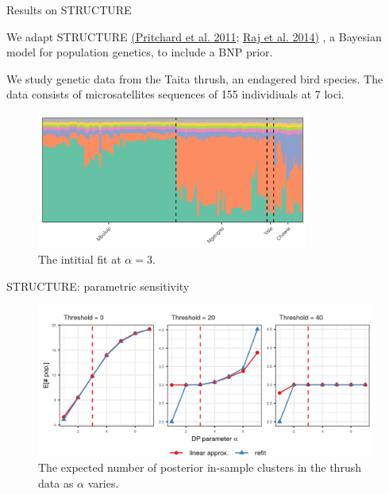 \begin{frame}{Results on STRUCTURE}

We adapt STRUCTURE
{\color{blue} \href{https://web.stanford.edu/group/pritchardlab/publications/pdfs/PritchardEtAl00.pdf}{(Pritchard et al. 2011};
\href{https://www.genetics.org/content/197/2/573}{Raj et al. 2014)}
},
a Bayesian model for population genetics, to include a BNP prior.


We study genetic data from the Taita thrush, an endagered bird species.
The data consists of microsatellites sequences of 155 individiuals at 7 loci.

\begin{figure}[!h]
\centering
\includegraphics[width = 0.8\textwidth]{./figures/structure_example.png}
\caption*{The intitial fit at $\alpha = 3$. }
\end{figure}
\end{frame}

\begin{frame}{STRUCTURE: parametric sensitivity}
  \begin{figure}[!h]
    \centering
    \includegraphics[width = \textwidth]{./figures/stucture_alpha_sens.png}
    \caption*{The expected number of posterior in-sample clusters in the thrush data as $\alpha$ varies.}
  \end{figure}

\end{frame}

